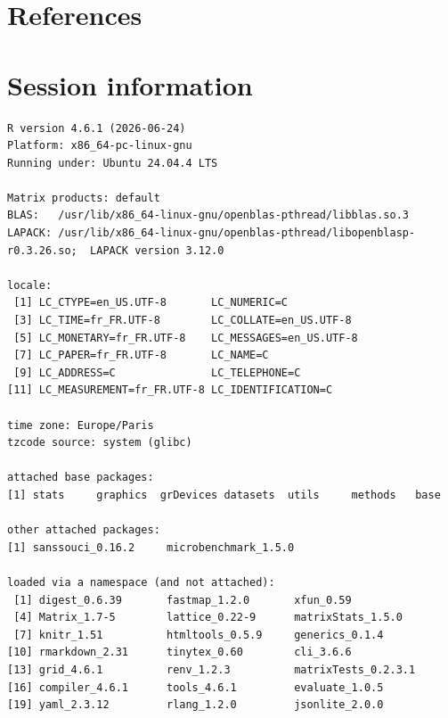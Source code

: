 \documentclass[
  11pt,
  a4paper,
]{article}
\theoremstyle{plain}
\theoremstyle{definition}
\theoremstyle{plain}
\theoremstyle{definition}
\theoremstyle{plain}
\theoremstyle{remark}
\begin{document}
\section*{References}\label{references}

\renewcommand{\bibsection}{}


\section*{Session information}\label{session-information}

\begin{verbatim}
R version 4.6.1 (2026-06-24)
Platform: x86_64-pc-linux-gnu
Running under: Ubuntu 24.04.4 LTS

Matrix products: default
BLAS:   /usr/lib/x86_64-linux-gnu/openblas-pthread/libblas.so.3 
LAPACK: /usr/lib/x86_64-linux-gnu/openblas-pthread/libopenblasp-r0.3.26.so;  LAPACK version 3.12.0

locale:
 [1] LC_CTYPE=en_US.UTF-8       LC_NUMERIC=C              
 [3] LC_TIME=fr_FR.UTF-8        LC_COLLATE=en_US.UTF-8    
 [5] LC_MONETARY=fr_FR.UTF-8    LC_MESSAGES=en_US.UTF-8   
 [7] LC_PAPER=fr_FR.UTF-8       LC_NAME=C                 
 [9] LC_ADDRESS=C               LC_TELEPHONE=C            
[11] LC_MEASUREMENT=fr_FR.UTF-8 LC_IDENTIFICATION=C       

time zone: Europe/Paris
tzcode source: system (glibc)

attached base packages:
[1] stats     graphics  grDevices datasets  utils     methods   base     

other attached packages:
[1] sanssouci_0.16.2     microbenchmark_1.5.0

loaded via a namespace (and not attached):
 [1] digest_0.6.39       fastmap_1.2.0       xfun_0.59          
 [4] Matrix_1.7-5        lattice_0.22-9      matrixStats_1.5.0  
 [7] knitr_1.51          htmltools_0.5.9     generics_0.1.4     
[10] rmarkdown_2.31      tinytex_0.60        cli_3.6.6          
[13] grid_4.6.1          renv_1.2.3          matrixTests_0.2.3.1
[16] compiler_4.6.1      tools_4.6.1         evaluate_1.0.5     
[19] yaml_2.3.12         rlang_1.2.0         jsonlite_2.0.0     
\end{verbatim}
\end{document}
